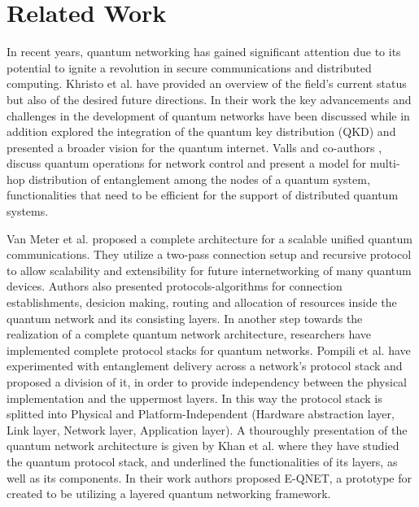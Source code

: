\documentclass[12pt,a4paper] {report}
\begin{document}
\chapter{Related Work}
		In recent years, quantum networking has gained
		significant attention due to its potential to ignite a revolution in
		secure communications and distributed computing.
		Khristo et al. \cite{Khristo2020} have provided an overview of the field's
		current status but also of the desired future directions.
		In their work the key advancements and challenges in the
		development of quantum networks have been discussed while in addition
		explored the integration of the quantum key distribution (QKD)
		and presented a broader vision for the quantum internet.
		Valls and co-authors \cite{brief-intro}, discuss quantum operations for network
		control and present a model for multi-hop distribution of entanglement among the nodes of
		a quantum system, functionalities that need to be efficient for the support of distributed
		quantum systems. 
	
		Van Meter et al. \cite{quantum-arch} proposed a complete architecture 
		for a scalable unified quantum communications. They utilize a two-pass connection setup and recursive protocol
		to allow scalability and extensibility for future internetworking
		of many quantum devices. Authors also presented protocols-algorithms for connection establishments, desicion making, routing and 
		allocation of resources inside the quantum network and its consisting layers.
		In another step towards the realization of a complete quantum network architecture,
		researchers have implemented complete protocol stacks for quantum networks.
		Pompili et al. \cite{pompilli} have experimented with entanglement delivery across 
		a network's protocol stack and proposed a division of it, in order to provide 
		independency between the physical implementation and the uppermost layers. 
		In this way the protocol stack is splitted into Physical and Platform-Independent
		(Hardware abstraction layer, Link layer, Network layer, Application layer).
		A thouroughly presentation of the quantum network architecture is given by Khan et al. \cite{e-qnet}
		where they have studied the quantum protocol stack, and underlined the functionalities of its layers, as well 
		as its components. In their work authors proposed E-QNET, a prototype for  created to be utilizing a layered quantum networking
		framework.
\end{document}
